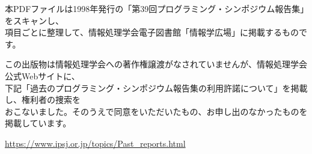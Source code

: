 \documentclass[b5j]{jsarticle}
\begin{document}
\begin{flushleft}

本PDFファイルは1998年発行の「第39回プログラミング・シンポジウム報告集」をスキャンし、\\項目ごとに整理して、情報処理学会電子図書館「情報学広場」に掲載するものです。

\medskip

この出版物は情報処理学会への著作権譲渡がなされていませんが、情報処理学会公式Webサイトに、\\下記「過去のプログラミング・シンポジウム報告集の利用許諾について」を掲載し、権利者の捜索を\\おこないました。そのうえで同意をいただいたもの、お申し出のなかったものを掲載しています。

\medskip

\url{https://www.ipsj.or.jp/topics/Past_reports.html}

\end{flushleft}

\bigskip
\end{document}
